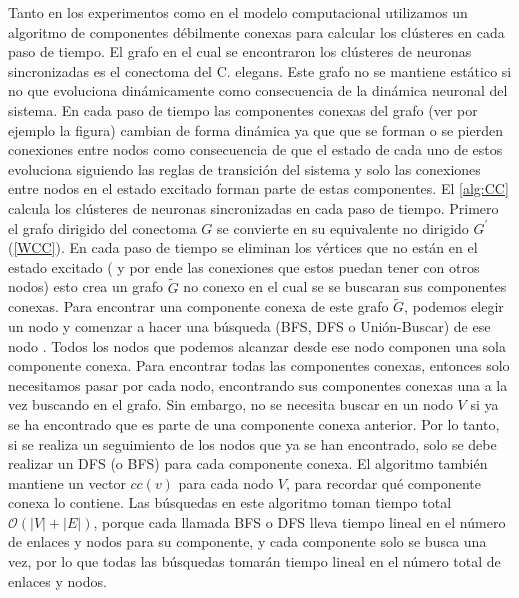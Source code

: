 Tanto en los experimentos como en el modelo computacional utilizamos un algoritmo de  componentes débilmente conexas para calcular los clústeres en cada paso de tiempo. El grafo en  el cual  se encontraron los clústeres de neuronas sincronizadas es el conectoma del C. elegans. Este grafo no se mantiene estático si no que evoluciona dinámicamente    como consecuencia de la dinámica neuronal del sistema. En cada paso de tiempo las componentes conexas del  grafo  (ver por ejemplo la figura)   cambian de forma dinámica ya que  que se forman o se pierden conexiones entre nodos  como consecuencia de que el estado de cada uno de estos evoluciona siguiendo las reglas de transición del sistema y solo las conexiones entre nodos en el estado excitado forman parte de estas componentes.   El \cref{alg:CC}   calcula los clústeres de neuronas sincronizadas en cada paso de tiempo.  Primero el grafo dirigido del conectoma $G$ se convierte en su equivalente no dirigido $G^\prime$ (\cref{WCC}). En cada paso de tiempo  se eliminan los  vértices que no están en el estado excitado ( y por ende las conexiones que estos puedan tener con otros nodos) esto crea un grafo $\tilde{G}$ no conexo en el cual se  se buscaran sus componentes conexas.    Para encontrar una componente conexa de este grafo $\tilde{G}$, podemos elegir un nodo y comenzar a hacer una búsqueda (\gls{BFS}, \gls{DFS} o  Unión-Buscar) de ese nodo \cite{dasgupta_algorithms_2006}. Todos los nodos que podemos alcanzar desde ese nodo componen una sola componente conexa. Para encontrar todas las componentes conexas, entonces solo necesitamos pasar por cada nodo, encontrando sus componentes conexas una a la vez buscando en el grafo. Sin embargo, no se necesita buscar en un nodo $V$ si ya se ha encontrado que es parte de una componente conexa anterior. Por lo tanto, si se realiza  un seguimiento de los nodos que ya se han encontrado, solo se debe realizar   un \gls{DFS} (o \gls{BFS}) para cada componente conexa.   El algoritmo también mantiene un vector $cc(v)$ para cada nodo $V$, para recordar qué componente conexa lo contiene.  Las búsquedas en este algoritmo toman tiempo total $\mathcal{O}\left(\left|V\right| + \left|E\right| \right)$, porque cada llamada \gls{BFS} o \gls{DFS} lleva tiempo lineal en el número de enlaces y nodos para su componente, y cada componente solo se busca una vez, por lo que todas las búsquedas tomarán tiempo lineal en el número total de enlaces y nodos.  

